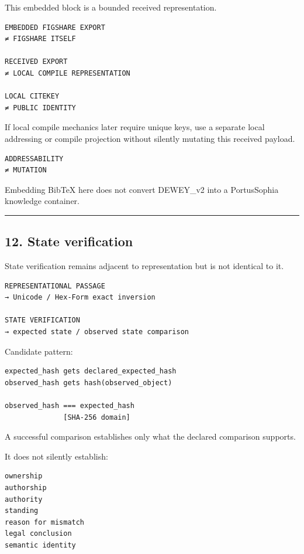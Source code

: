 This embedded block is a bounded received representation.

\begin{verbatim}
EMBEDDED FIGSHARE EXPORT
≠ FIGSHARE ITSELF

RECEIVED EXPORT
≠ LOCAL COMPILE REPRESENTATION

LOCAL CITEKEY
≠ PUBLIC IDENTITY
\end{verbatim}

If local compile mechanics later require unique keys, use a separate
local addressing or compile projection without silently mutating this
received payload.

\begin{verbatim}
ADDRESSABILITY
≠ MUTATION
\end{verbatim}

Embedding BibTeX here does not convert DEWEY\_v2 into a PortusSophia
knowledge container.

\begin{center}\rule{0.5\linewidth}{0.5pt}\end{center}

\subsection{12. State verification}\label{state-verification}

State verification remains adjacent to representation but is not
identical to it.

\begin{verbatim}
REPRESENTATIONAL PASSAGE
→ Unicode / Hex-Form exact inversion

STATE VERIFICATION
→ expected state / observed state comparison
\end{verbatim}

Candidate pattern:

\begin{verbatim}
expected_hash gets declared_expected_hash
observed_hash gets hash(observed_object)

observed_hash === expected_hash
              [SHA-256 domain]
\end{verbatim}

A successful comparison establishes only what the declared comparison
supports.

It does not silently establish:

\begin{verbatim}
ownership
authorship
authority
standing
reason for mismatch
legal conclusion
semantic identity
\end{verbatim}

